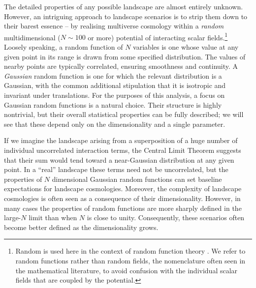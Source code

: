 \documentclass[12pt]{article}
\begin{document}
The detailed properties of any possible landscape are almost entirely unknown.  However, an intriguing approach to landscape scenarios is to strip them down to their barest essence -- by realising multiverse cosmology within a {\em random\/} multidimensional ($N\sim100$ or more) potential of interacting scalar fields.\footnote{Random is used here in the  context of random function theory \cite{GRF1, GRF2, GRF3}.  We refer to random functions rather than random fields, the nomenclature often seen in the mathematical literature, to avoid confusion with the individual scalar fields that are coupled by the potential.} Loosely speaking, a random function of $N$ variables is one whose value at any given point in its range is drawn from some specified distribution. The values of nearby points are typically correlated, ensuring smoothness and continuity. A {\em Gaussian\/} random function is one for which the relevant distribution is a Gaussian, with the common additional stipulation that it is isotropic and invariant under translations. For the purposes of this analysis, a focus on Gaussian random functions is a natural choice. Their structure is highly nontrivial, but their overall statistical properties can be fully described; we will see that these depend only on the dimensionality and a single parameter. 

If we imagine the landscape arising from a superposition of a huge number of individual uncorrelated interaction terms, the Central Limit Theorem suggests that their sum would tend toward a near-Gaussian distribution at any given point. In a ``real'' landscape these terms need not be uncorrelated, but the properties of $N$ dimensional Gaussian random functions can set baseline expectations for landscape cosmologies.  Moreover, the complexity of landscape cosmologies is often seen as a consequence of their dimensionality. However, in many cases the properties of random functions are more sharply defined in the large-$N$ limit than when $N$ is close to unity. Consequently, these scenarios often become better defined as the dimensionality grows.
 
\end{document}
